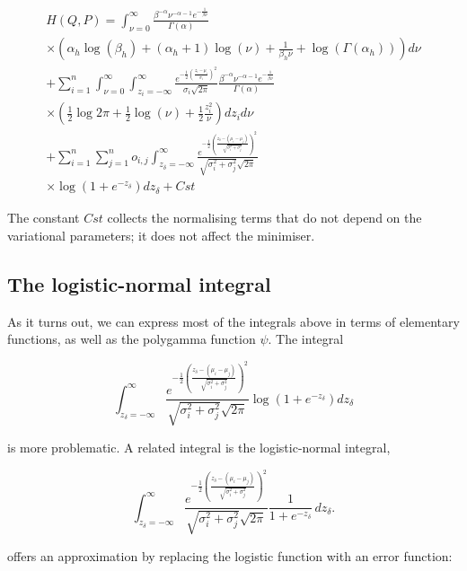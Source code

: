 \documentclass[12pt]{article}
\begin{document}
\begin{multline*}
    H(Q,P) = \int_{\nu=0}^{\infty} \frac{\beta^{-\alpha}\nu^{-\alpha-1}e^{-\frac{1}{\beta \nu}}}{\Gamma(\alpha)} \\
\times \left(\alpha_h \log(\beta_h) + (\alpha_h+1)\log(\nu) + \frac{1}{\beta_h \nu} + \log(\Gamma(\alpha_h))\right) d\nu
\\
+ \sum_{i=1}^n \int_{\nu=0}^{\infty} \int_{z_i=-\infty}^{\infty} \frac{e^{-\frac{1}{2}\left(\frac{z_i-\mu_i}{\sigma_i}\right)^2}}{\sigma_i \sqrt{2 \pi}} \frac{\beta^{-\alpha}\nu^{-\alpha-1}e^{-\frac{1}{\beta \nu}}}{\Gamma(\alpha)} \\
\times \left(
\frac{1}{2} \log{2\pi} + \frac{1}{2}\log(\nu) + \frac{1}{2}\frac{z_i^2}{\nu}
\right)dz_i d\nu\\
+ \sum_{i=1}^n\sum_{j=1}^n o_{i,j} \int_{z_\delta=-\infty}^{\infty}
\frac{e^{-\frac{1}{2}\left(\frac{z_\delta - (\mu_i - \mu_j)}{\sqrt{\sigma_i^2 + \sigma_j^2}}\right)^2}}{\sqrt{\sigma_i^2 + \sigma_j^2} \sqrt{2 \pi}} \\
\times \log\left(1 + e^{-z_\delta}\right) dz_\delta + Cst
\end{multline*}

The constant $Cst$ collects the normalising terms that do not depend on the variational parameters; it does not affect the minimiser.


\subsection{The logistic-normal integral}
\label{sec:integral}

As it turns out, we can express most of the integrals above in terms of elementary functions, as well as the polygamma function $\psi$.
The integral

$$\int_{z_\delta=-\infty}^{\infty}
\frac{e^{-\frac{1}{2}\left(\frac{z_\delta - (\mu_i - \mu_j)}{\sqrt{\sigma_i^2 + \sigma_j^2}}\right)^2}}{\sqrt{\sigma_i^2 + \sigma_j^2} \sqrt{2 \pi}} \log\left(1 + e^{-z_\delta}\right) dz_\delta$$

is more problematic. A related integral is the logistic-normal integral,

$$\int_{z_\delta=-\infty}^{\infty}
\frac{e^{-\frac{1}{2}\left(\frac{z_\delta - (\mu_i - \mu_j)}{\sqrt{\sigma_i^2 + \sigma_j^2}}\right)^2}}{\sqrt{\sigma_i^2 + \sigma_j^2} \sqrt{2 \pi}} \frac{1}{1 + e^{-z_\delta}}\, dz_\delta.$$

\cite{crooks2009logistic} offers an approximation by replacing the logistic function with an error function:
\end{document}
